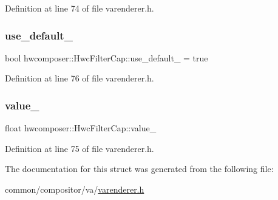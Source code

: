 Definition at line 74 of file varenderer.\+h.

\mbox{\label{structhwcomposer_1_1HwcFilterCap_ab934d5bbd9e4f61bdafccd6d620f3e09}} 
\subsubsection{\texorpdfstring{use\+\_\+default\+\_\+}{use\_default\_}}
{\footnotesize\ttfamily bool hwcomposer\+::\+Hwc\+Filter\+Cap\+::use\+\_\+default\+\_\+ = true}



Definition at line 76 of file varenderer.\+h.

\mbox{\label{structhwcomposer_1_1HwcFilterCap_add5d14e96796b2c0230f11a99fa1254f}} 
\subsubsection{\texorpdfstring{value\+\_\+}{value\_}}
{\footnotesize\ttfamily float hwcomposer\+::\+Hwc\+Filter\+Cap\+::value\+\_\+}



Definition at line 75 of file varenderer.\+h.



The documentation for this struct was generated from the following file\+:\begin{DoxyCompactItemize}
\item 
common/compositor/va/\mbox{\hyperlink{varenderer_8h}{varenderer.\+h}}\end{DoxyCompactItemize}
